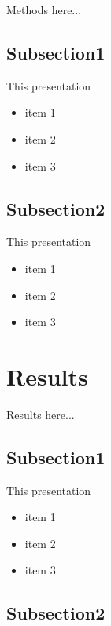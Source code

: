 \documentclass{beamer}
\begin{document}
\begin{frame}
	Methods here...
\end{frame}

\subsection[Subsec1]{Subsection1}

\begin{frame}{This presentation}
	\begin{itemize}
		\item item 1
		\item item 2
		\item item 3
	\end{itemize}
\end{frame}

\subsection[Subsec2]{Subsection2}

\begin{frame}{This presentation}
	\begin{itemize}
		\item item 1
		\item item 2
		\item item 3
	\end{itemize}
\end{frame}

\section{Results}

\begin{frame}
	Results here...
\end{frame}

\subsection[Subsec1]{Subsection1}

\begin{frame}{This presentation}
	\begin{itemize}
		\item item 1
		\item item 2
		\item item 3
	\end{itemize}
\end{frame}

\subsection[Subsec2]{Subsection2}
\end{document}
